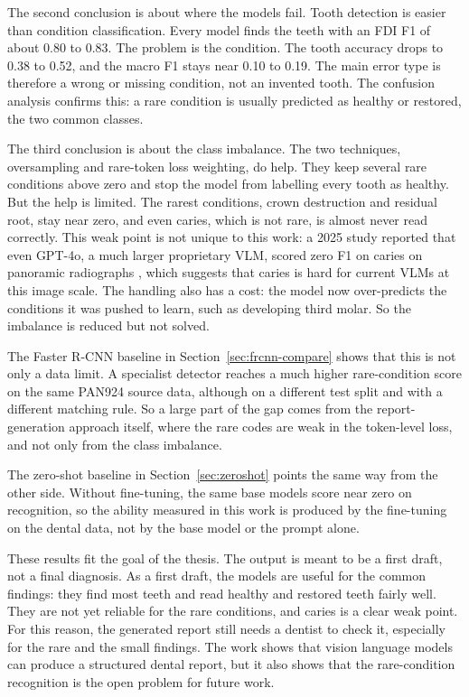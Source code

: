 \documentclass[a4paper,12pt]{report}
\begin{document}
The second conclusion is about where the models fail. Tooth detection is easier than condition classification. Every model finds the teeth with an FDI F1 of about 0.80 to 0.83. The problem is the condition. The tooth accuracy drops to 0.38 to 0.52, and the macro F1 stays near 0.10 to 0.19. The main error type is therefore a wrong or missing condition, not an invented tooth. The confusion analysis confirms this: a rare condition is usually predicted as healthy or restored, the two common classes.

The third conclusion is about the class imbalance. The two techniques, oversampling and rare-token loss weighting, do help. They keep several rare conditions above zero and stop the model from labelling every tooth as healthy. But the help is limited. The rarest conditions, crown destruction and residual root, stay near zero, and even caries, which is not rare, is almost never read correctly. This weak point is not unique to this work: a 2025 study reported that even GPT-4o, a much larger proprietary VLM, scored zero F1 on caries on panoramic radiographs \cite{liu2025dentalvlm}, which suggests that caries is hard for current VLMs at this image scale. The handling also has a cost: the model now over-predicts the conditions it was pushed to learn, such as developing third molar. So the imbalance is reduced but not solved.

The Faster R-CNN baseline in Section~\ref{sec:frcnn-compare} shows that this is not only a data limit. A specialist detector reaches a much higher rare-condition score on the same PAN924 source data, although on a different test split and with a different matching rule. So a large part of the gap comes from the report-generation approach itself, where the rare codes are weak in the token-level loss, and not only from the class imbalance.

The zero-shot baseline in Section~\ref{sec:zeroshot} points the same way from the other side. Without fine-tuning, the same base models score near zero on recognition, so the ability measured in this work is produced by the fine-tuning on the dental data, not by the base model or the prompt alone.

These results fit the goal of the thesis. The output is meant to be a first draft, not a final diagnosis. As a first draft, the models are useful for the common findings: they find most teeth and read healthy and restored teeth fairly well. They are not yet reliable for the rare conditions, and caries is a clear weak point. For this reason, the generated report still needs a dentist to check it, especially for the rare and the small findings. The work shows that vision language models can produce a structured dental report, but it also shows that the rare-condition recognition is the open problem for future work.
\end{document}
